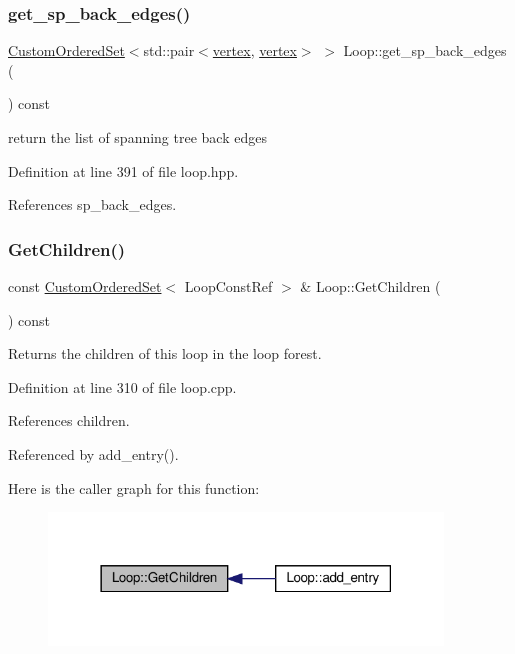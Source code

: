 \subsubsection{\texorpdfstring{get\+\_\+sp\+\_\+back\+\_\+edges()}{get\_sp\_back\_edges()}}
{\footnotesize\ttfamily \hyperlink{classCustomOrderedSet}{Custom\+Ordered\+Set}$<$std\+::pair$<$\hyperlink{graph_8hpp_abefdcf0544e601805af44eca032cca14}{vertex}, \hyperlink{graph_8hpp_abefdcf0544e601805af44eca032cca14}{vertex}$>$ $>$ Loop\+::get\+\_\+sp\+\_\+back\+\_\+edges (\begin{DoxyParamCaption}{ }\end{DoxyParamCaption}) const\hspace{0.3cm}{\ttfamily [inline]}}



return the list of spanning tree back edges 



Definition at line 391 of file loop.\+hpp.



References sp\+\_\+back\+\_\+edges.

\mbox{\label{classLoop_ad95fae3f5f83c509c9d3a35b471ccf97}} 
\subsubsection{\texorpdfstring{Get\+Children()}{GetChildren()}}
{\footnotesize\ttfamily const \hyperlink{classCustomOrderedSet}{Custom\+Ordered\+Set}$<$ Loop\+Const\+Ref $>$ \& Loop\+::\+Get\+Children (\begin{DoxyParamCaption}{ }\end{DoxyParamCaption}) const}



Returns the children of this loop in the loop forest. 



Definition at line 310 of file loop.\+cpp.



References children.



Referenced by add\+\_\+entry().

Here is the caller graph for this function\+:
\nopagebreak
\begin{figure}[H]
\begin{center}
\leavevmode
\includegraphics[width=297pt]{de/d77/classLoop_ad95fae3f5f83c509c9d3a35b471ccf97_icgraph}
\end{center}
\end{figure}
\mbox{\label{classLoop_ada724b948e80a1e01ea8f69bd240d2f9}} 
